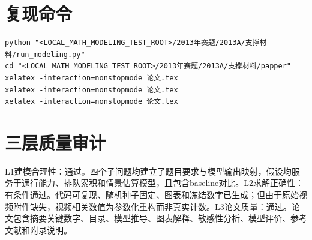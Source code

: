\documentclass[UTF8,a4paper,12pt]{ctexart}
\begin{document}
\section{复现命令}
\begin{verbatim}
python "<LOCAL_MATH_MODELING_TEST_ROOT>/2013年赛题/2013A/支撑材料/run_modeling.py"
cd "<LOCAL_MATH_MODELING_TEST_ROOT>/2013年赛题/2013A/支撑材料/papper"
xelatex -interaction=nonstopmode 论文.tex
xelatex -interaction=nonstopmode 论文.tex
xelatex -interaction=nonstopmode 论文.tex
\end{verbatim}

\section{三层质量审计}
L1建模合理性：通过。四个子问题均建立了题目要求与模型输出映射，假设均服务于通行能力、排队累积和情景估算模型，且包含baseline对比。L2求解正确性：有条件通过。代码可复现、随机种子固定、图表和冻结数字已生成；但由于原始视频附件缺失，视频相关数值为参数化重构而非真实计数。L3论文质量：通过。论文包含摘要关键数字、目录、模型推导、图表解释、敏感性分析、模型评价、参考文献和附录说明。
\end{document}
